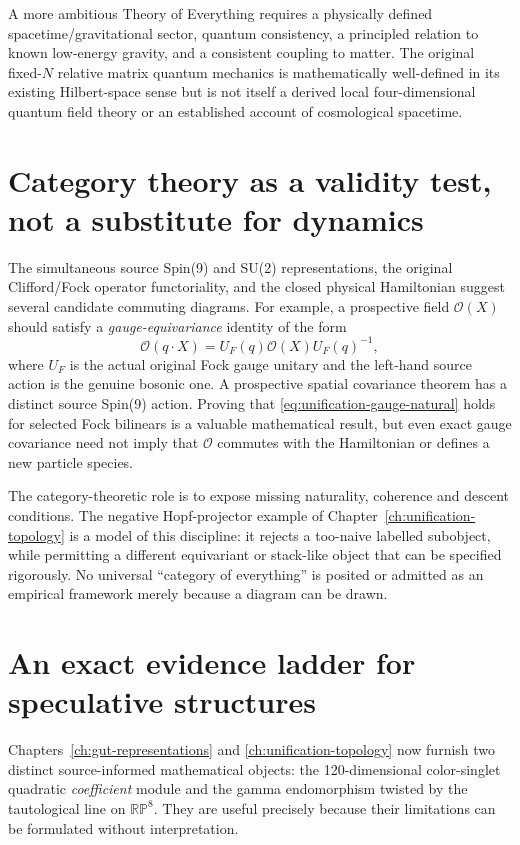 A more ambitious Theory of Everything requires a physically defined
spacetime/gravitational sector, quantum consistency, a principled
relation to known low-energy gravity, and a consistent coupling to
matter. The original fixed-$N$ relative matrix quantum mechanics is
mathematically well-defined in its existing Hilbert-space sense but
is not itself a derived local four-dimensional quantum field theory
or an established account of cosmological spacetime.

\section{Category theory as a validity test, not a substitute for dynamics}
The simultaneous source Spin(9) and SU(2) representations, the
original Clifford/Fock operator functoriality, and the closed physical
Hamiltonian suggest several candidate commuting diagrams. For
example, a prospective field $\mathcal O(X)$ should satisfy a
\emph{gauge-equivariance} identity of the form
\begin{equation}\label{eq:unification-gauge-natural}
 \mathcal O(q\!\cdot\!X)=U_F(q)\mathcal O(X)U_F(q)^{-1},
\end{equation}
where $U_F$ is the actual original Fock gauge unitary and the
left-hand source action is the genuine bosonic one. A prospective
spatial covariance theorem has a distinct source Spin(9) action.
Proving that \eqref{eq:unification-gauge-natural} holds for selected
Fock bilinears is a valuable mathematical result, but even exact
gauge covariance need not imply that $\mathcal O$ commutes with the
Hamiltonian or defines a new particle species.

The category-theoretic role is to expose missing naturality,
coherence and descent conditions. The negative Hopf-projector
example of Chapter~\ref{ch:unification-topology} is a model of
this discipline: it rejects a too-naive labelled subobject, while
permitting a different equivariant or stack-like object that can be
specified rigorously. No universal ``category of everything'' is
posited or admitted as an empirical framework merely because a
diagram can be drawn.


\section{An exact evidence ladder for speculative structures}
Chapters~\ref{ch:gut-representations} and
\ref{ch:unification-topology} now furnish two
distinct source-informed mathematical objects:
the 120-dimensional color-singlet quadratic
\emph{coefficient} module and the gamma endomorphism
twisted by the tautological line on $\mathbb{RP}^8$.
They are useful precisely because their limitations
can be formulated without interpretation.

